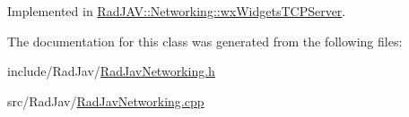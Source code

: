Implemented in \hyperlink{class_rad_j_a_v_1_1_networking_1_1wx_widgets_t_c_p_server_a5f4d94b2c8d1972c3b01c6de0eee3fc6}{Rad\+J\+A\+V\+::\+Networking\+::wx\+Widgets\+T\+C\+P\+Server}.



The documentation for this class was generated from the following files\+:\begin{DoxyCompactItemize}
\item 
include/\+Rad\+Jav/\hyperlink{_rad_jav_networking_8h}{Rad\+Jav\+Networking.\+h}\item 
src/\+Rad\+Jav/\hyperlink{_rad_jav_networking_8cpp}{Rad\+Jav\+Networking.\+cpp}\end{DoxyCompactItemize}
